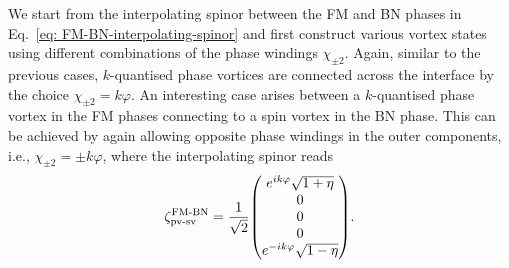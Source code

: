 We start from the interpolating spinor between the FM and BN phases in
Eq.~\eqref{eq: FM-BN-interpolating-spinor} and first construct various vortex
states using different combinations of the phase windings \(\chi_{\pm 2}\).
Again, similar to the previous cases, \(k\)-quantised phase vortices are
connected across the interface by the choice \(\chi_{\pm 2} = k\varphi \).
An interesting case arises between a \(k\)-quantised phase vortex in the FM
phases connecting to a spin vortex in the BN phase.
This can be achieved by again allowing opposite phase windings in the outer
components, i.e., \(\chi_{\pm 2} = \pm k\varphi \), where the interpolating
spinor reads
\begin{align}\label{eq: FM-BN-pv-sv}
    \zeta^\text{FM-BN}_\text{pv-sv} = \frac{1}{\sqrt{2}}\mqty(
    e^{ik\varphi} \sqrt{1 + \eta} \\
    0 \\
    0 \\
    0 \\
    e^{-ik\varphi} \sqrt{1 - \eta}).
\end{align}

